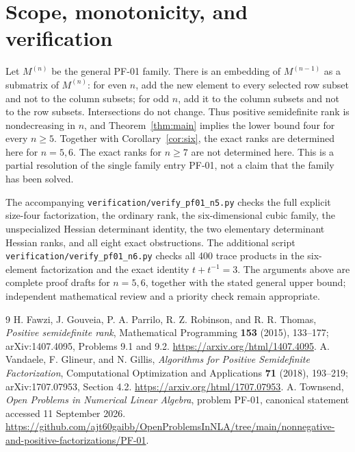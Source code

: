 \documentclass[11pt]{article}
\begin{document}
\section{Scope, monotonicity, and verification}
Let $M^{(n)}$ be the general PF-01 family. There is an embedding of $M^{(n-1)}$ as a submatrix of $M^{(n)}$: for even $n$, add the new element to every selected row subset and not to the column subsets; for odd $n$, add it to the column subsets and not to the row subsets. Intersections do not change. Thus positive semidefinite rank is nondecreasing in $n$, and Theorem~\ref{thm:main} implies the lower bound four for every $n\geq5$. Together with Corollary~\ref{cor:six}, the exact ranks are determined here for $n=5,6$. The exact ranks for $n\geq7$ are not determined here. This is a partial resolution of the single family entry PF-01, not a claim that the family has been solved.

The accompanying \texttt{verification/verify\_pf01\_n5.py} checks the full explicit size-four factorization, the ordinary rank, the six-dimensional cubic family, the unspecialized Hessian determinant identity, the two elementary determinant Hessian ranks, and all eight exact obstructions. The additional script \texttt{verification/verify\_pf01\_n6.py} checks all 400 trace products in the six-element factorization and the exact identity $t+t^{-1}=3$. The arguments above are complete proof drafts for $n=5,6$, together with the stated general upper bound; independent mathematical review and a priority check remain appropriate.

\begin{thebibliography}{9}
H. Fawzi, J. Gouveia, P. A. Parrilo, R. Z. Robinson, and R. R. Thomas,
\emph{Positive semidefinite rank}, Mathematical Programming \textbf{153} (2015), 133--177; arXiv:1407.4095, Problems 9.1 and 9.2.
\url{https://arxiv.org/html/1407.4095}.
A. Vandaele, F. Glineur, and N. Gillis,
\emph{Algorithms for Positive Semidefinite Factorization}, Computational Optimization and Applications \textbf{71} (2018), 193--219; arXiv:1707.07953, Section 4.2.
\url{https://arxiv.org/html/1707.07953}.
A. Townsend, \emph{Open Problems in Numerical Linear Algebra}, problem PF-01,
canonical statement accessed 11 September 2026.
\url{https://github.com/ajt60gaibb/OpenProblemsInNLA/tree/main/nonnegative-and-positive-factorizations/PF-01}.
\end{thebibliography}
\end{document}
